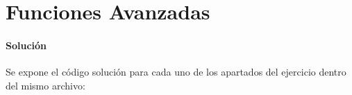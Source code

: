 \section{Funciones Avanzadas}
  
  \paragraph{Solución}
  Se expone el código solución para cada
  uno de los apartados del ejercicio dentro
  del mismo archivo:
  
  